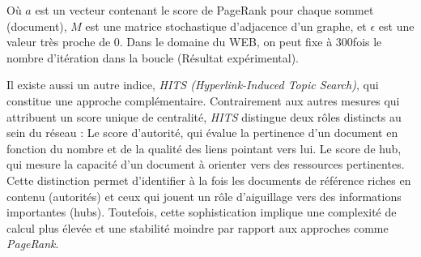 \documentclass{article}
\begin{document}
        Où $a$ est un vecteur contenant le score de PageRank pour chaque sommet (document), $M$ est une matrice stochastique d'adjacence d'un graphe, et $\epsilon$ est une valeur très proche de 0. Dans le domaine du WEB, on peut fixe à $300$fois le nombre d'itération dans la boucle (Résultat expérimental).

    Il existe aussi un autre indice, \textit{HITS (Hyperlink-Induced Topic Search)}, qui constitue une approche complémentaire. Contrairement aux autres mesures qui attribuent un score unique de centralité, \textit{HITS} distingue deux rôles distincts au sein du réseau :
    Le score d’autorité, qui évalue la pertinence d’un document en fonction du nombre et de la qualité des liens pointant vers lui.
    Le score de hub, qui mesure la capacité d’un document à orienter vers des ressources pertinentes.
    Cette distinction permet d’identifier à la fois les documents de référence riches en contenu (autorités) et ceux qui jouent un rôle d’aiguillage vers des informations importantes (hubs). Toutefois, cette sophistication implique une complexité de calcul plus élevée et une stabilité moindre par rapport aux approches comme \textit{PageRank}.
\end{document}
